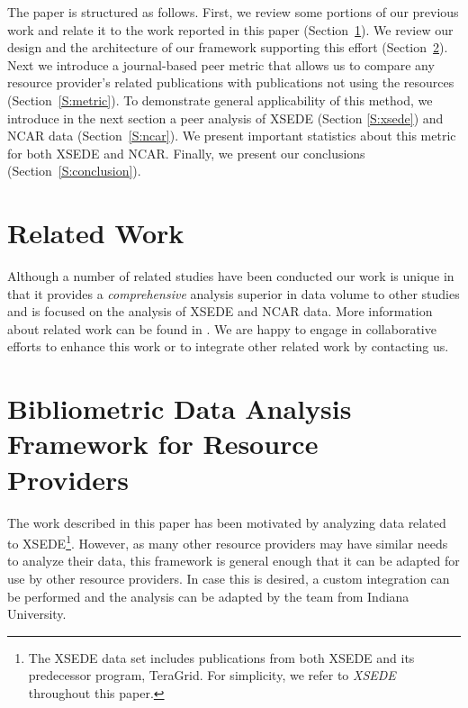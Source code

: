 \documentclass[10pt, conference, compsocconf]{IEEEtran}
\begin{document}
The paper is structured as follows. First, we review some portions of our previous work and relate it to the work reported in this paper (Section~\ref{S:related}). We review our design and the architecture of our framework supporting this effort (Section~\ref{S:framework}). Next we introduce a journal-based peer metric that allows us to compare any resource provider's related publications with publications not using the resources (Section~\ref{S:metric}).  To demonstrate general applicability of this method, we introduce in the next section a peer analysis of XSEDE (Section \ref{S:xsede}) and NCAR data (Section~\ref{S:ncar}). We present important statistics about this metric for both XSEDE and NCAR. Finally, we present our conclusions (Section~\ref{S:conclusion}).




\section{Related Work} \label{S:related}

Although a number of related studies have been conducted
\cite{thomas1998institutional,
  Bollen:2007:MUM:1255175.1255273,Bollen:2008:TUI:1378889.1378928,
  bollen2009principal,bollen2011and} our work is unique in that it provides a {\em comprehensive} analysis superior in data volume to other studies and is focused on the analysis of XSEDE and NCAR data. More information about related work can be found in \cite{las14impact}. We are happy to engage in collaborative efforts to enhance this work or to integrate other related work by contacting us.

\section{Bibliometric Data Analysis \\Framework for Resource
  \\Providers} \label{S:framework}

The work described in this paper has been motivated by analyzing data related to XSEDE\footnote{The XSEDE data set includes publications from both XSEDE and its predecessor program, TeraGrid. For simplicity, we refer to {\em XSEDE} throughout this paper.}. However, as many other resource providers may have similar needs to analyze their data, this framework is general enough that it can be adapted for use by other resource providers. In case this is desired, a custom integration can be performed and the analysis can be adapted by the team from Indiana University. 
\end{document}
